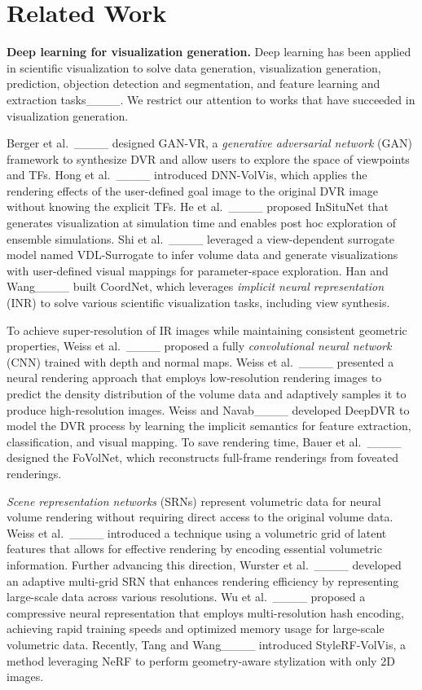 \section{Related Work}
{\bf Deep learning for visualization generation.} 
Deep learning has been applied in scientific visualization to solve data generation, visualization generation, prediction, objection detection and segmentation, and feature learning and extraction tasks____.
We restrict our attention to works that have succeeded in visualization generation.

Berger et al.\ ____ designed GAN-VR, a {\em generative adversarial network} (GAN) framework to synthesize DVR and allow users to explore the space of viewpoints and TFs.
Hong et al.\ ____ introduced DNN-VolVis, which applies the rendering effects of the user-defined goal image to the original DVR image without knowing the explicit TFs. 
He et al.\ ____ proposed InSituNet that generates visualization at simulation time and enables post hoc exploration of ensemble simulations.
Shi et al.\ ____ leveraged a view-dependent surrogate model named VDL-Surrogate to infer volume data and generate visualizations with user-defined visual mappings for parameter-space exploration.
Han and Wang____ built CoordNet, which leverages {\em implicit neural representation} (INR) to solve various scientific visualization tasks, including view synthesis.

To achieve super-resolution of IR images while maintaining consistent geometric properties, Weiss et al.\ ____ proposed a fully {\em convolutional neural network} (CNN) trained with depth and normal maps.
Weiss et al.\ ____ presented a neural rendering approach that employs low-resolution rendering images to predict the density distribution of the volume data and adaptively samples it to produce high-resolution images.
Weiss and Navab____ developed DeepDVR to model the DVR process by learning the implicit semantics for feature extraction, classification, and visual mapping. 
To save rendering time, Bauer et al.\ ____ designed the FoVolNet, which reconstructs full-frame renderings from foveated renderings.

{\em Scene representation networks} (SRNs) represent volumetric data for neural volume rendering without requiring direct access to the original volume data. 
Weiss et al.\ ____ introduced a technique using a volumetric grid of latent features that allows for effective rendering by encoding essential volumetric information.
Further advancing this direction, Wurster et al.\ ____ developed an adaptive multi-grid SRN that enhances rendering efficiency by representing large-scale data across various resolutions. 
Wu et al.\ ____ proposed a compressive neural representation that employs multi-resolution hash encoding, achieving rapid training speeds and optimized memory usage for large-scale volumetric data.
Recently, Tang and Wang____ introduced StyleRF-VolVis, a method leveraging NeRF to perform geometry-aware stylization with only 2D images.

